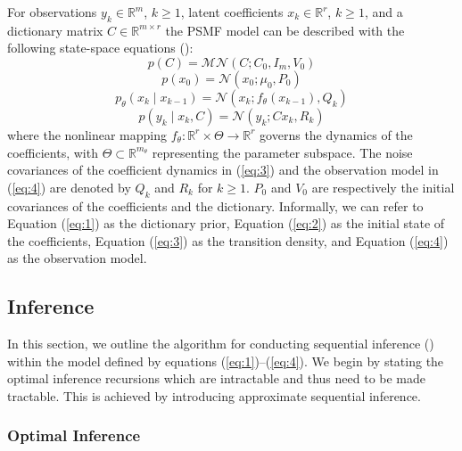 \documentclass{mldsmsc}
\begin{document}
For observations $y_k \in \mathbb{R}^{m}$, $k \geq 1$, latent coefficients $x_k \in \mathbb{R}^{r}$, $k \geq 1$, and a dictionary matrix $C \in \mathbb{R}^{m \times r}$ the PSMF model can be described with the following state-space equations (\cite{akyildiz2021probabilistic}):
\begin{equation} \label{eq:1}
    p(C) = \mathcal{MN}(C; C_0, I_m, V_0)
\end{equation}
\begin{equation} \label{eq:2}
    p(x_0) = \mathcal{N}(x_0; \mu_0, P_0)
\end{equation}
\begin{equation} \label{eq:3}
    p_{\theta}(x_k \mid x_{k-1}) = \mathcal{N}(x_k; f_{\theta}(x_{k-1}), Q_k)
\end{equation}
\begin{equation} \label{eq:4}
    p(y_k \mid x_k, C) = \mathcal{N}(y_k; Cx_k, R_k)
\end{equation}
where the nonlinear mapping $f_{\theta} : \mathbb{R}^{r} \times \Theta \rightarrow \mathbb{R}^{r}$ governs the dynamics of the coefficients, with $\Theta \subset \mathbb{R}^{m_{\theta}}$ representing the parameter subspace. The noise covariances of the coefficient dynamics in (\ref{eq:3}) and the observation model in (\ref{eq:4}) are denoted by $Q_k$ and $R_k$ for $k \geq 1$. $P_0$ and $V_0$ are respectively the initial covariances of the coefficients and the dictionary. Informally, we can refer to Equation (\ref{eq:1}) as the dictionary prior, Equation (\ref{eq:2}) as the initial state of the coefficients, Equation (\ref{eq:3}) as the transition density, and Equation (\ref{eq:4}) as the observation model.

\subsection{Inference}

In this section, we outline the algorithm for conducting sequential inference (\cite{akyildiz2021probabilistic}) within the model defined by equations (\ref{eq:1})–(\ref{eq:4}). We begin by stating the optimal inference recursions which are intractable and thus need to be made tractable. This is achieved by introducing approximate sequential inference.

\subsubsection{Optimal Inference}
\end{document}
